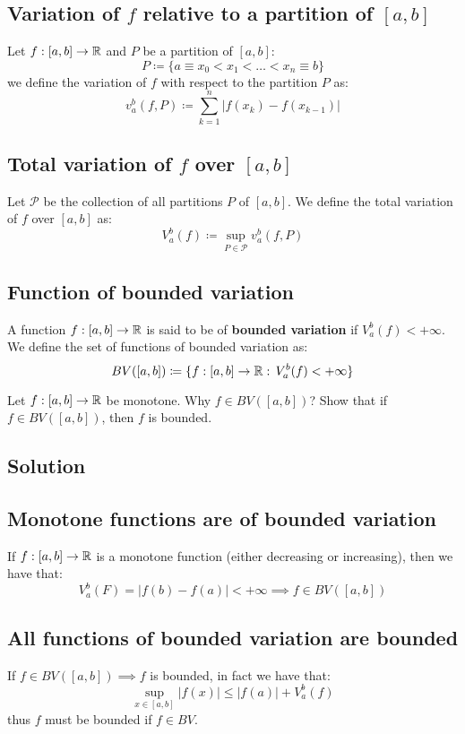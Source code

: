 \subsection{Variation of \texorpdfstring{$f$}{f} relative to a partition of \texorpdfstring{$[a, b]$}{[a,b]}}
Let $f : [a, b] \to \mathbb{R}$ and $P$ be a partition of $[a, b]$:
\[
    P \coloneqq \{ a \equiv x_0 < x_1 < \dots < x_n \equiv b \}    
\]
we define the variation of $f$ with respect to the partition $P$ as:
\[
    v_a^b(f,P) \coloneqq \sum_{k=1}^n |f(x_k) - f(x_{k-1})|
\]

\subsection{Total variation of \texorpdfstring{$f$}{f} over \texorpdfstring{$[a, b]$}{[a,b]}}
Let $\mathcal{P}$ be the collection of all partitions $P$ of $[a, b]$. We define the total variation of $f$ over $[a, b]$ as:
\[
    V_a^b(f) \coloneqq \sup_{P \in \mathcal{P}} v_a^b(f,P)    
\]

\subsection{Function of bounded variation}
A function $f : [a, b] \to \mathbb{R}$ is said to be of \textbf{bounded variation} if $V_a^b(f) < +\infty$. We define the set of functions of bounded variation as:
\[
    BV([a,b]) \coloneqq \{ f:[a,b]\to\mathbb{R}: \, V_a^b(f)<+\infty \}    
\]


\question
Let $f : [a, b] \to \mathbb{R}$ be monotone. Why $f \in BV ([a, b])$? Show that if $f \in BV ([a, b])$, then $f$ is bounded.

\subsection*{Solution}

\subsection{Monotone functions are of bounded variation}
If $f:[a,b]\to\mathbb{R}$ is a monotone function (either decreasing or increasing), then we have that:
\[
    V_a^b(F) = |f(b)-f(a)| < +\infty \implies f \in BV([a,b])    
\]

\subsection{All functions of bounded variation are bounded}
If $f\in BV([a,b]) \implies f$ is bounded, in fact we have that:
\[
    \sup_{x\in[a,b]} |f(x)| \leq |f(a)| + V_a^b(f)    
\]
thus $f$ must be bounded if $f\in BV$.

